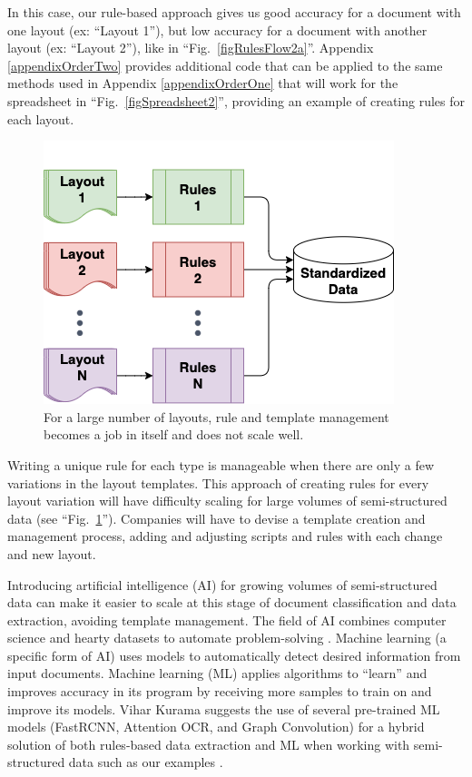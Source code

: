 \documentclass[conference]{IEEEtran}
\begin{document}
In this case, our rule-based approach gives us good accuracy for a document with one layout (ex: ``Layout 1''), but low accuracy for a document with another layout (ex: ``Layout 2''), like in ``Fig.~\ref{figRulesFlow2a}''. Appendix \ref{appendixOrderTwo} provides additional code that can be applied to the same methods used in Appendix \ref{appendixOrderOne} that will work for the spreadsheet in ``Fig.~\ref{figSpreadsheet2}'', providing an example of creating rules for each layout.

\begin{figure}[ht]
\centerline{\includegraphics[width=\columnwidth]{RulesFlowN.png}}
\caption{For a large number of layouts, rule and template management becomes a job in itself and does not scale well.}
\label{figRulesFlow3}
\end{figure}

Writing a unique rule for each type is manageable when there are only a few variations in the layout templates. This approach of creating rules for every layout variation will have difficulty scaling for large volumes of semi-structured data (see ``Fig.~\ref{figRulesFlow3}''). Companies will have to devise a template creation and management process, adding and adjusting scripts and rules with each change and new layout.

Introducing artificial intelligence (AI) for growing volumes of semi-structured data can make it easier to scale at this stage of document classification and data extraction, avoiding template management. The field of AI combines computer science and hearty datasets to automate problem-solving \cite{ibm:ai}. Machine learning (a specific form of AI) uses models to automatically detect desired information from input documents. Machine learning (ML) applies algorithms to ``learn'' and improves accuracy in its program by receiving more samples to train on and improve its models. Vihar Kurama suggests the use of several pre-trained ML models (FastRCNN, Attention OCR, and Graph Convolution) for a hybrid solution of both rules-based data extraction and ML when working with semi-structured data such as our examples \cite{kurama2021a}.
\end{document}
